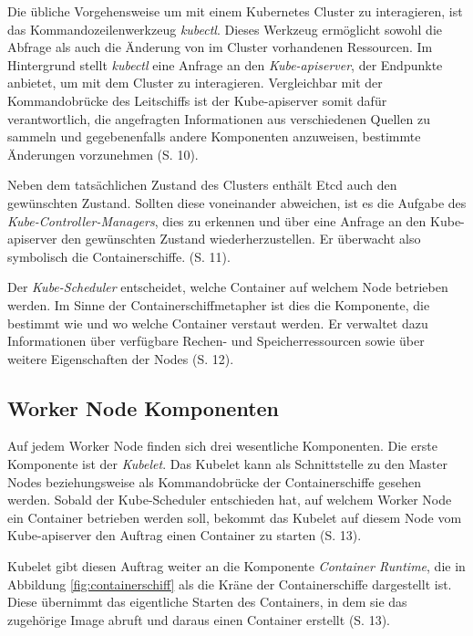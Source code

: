 \documentclass[11pt,a4paper]{article}
\begin{document}
Die übliche Vorgehensweise um mit einem Kubernetes Cluster zu interagieren, ist das Kommandozeilenwerkzeug \emph{kubectl}.
Dieses Werkzeug ermöglicht sowohl die Abfrage als auch die Änderung von im Cluster vorhandenen Ressourcen.
Im Hintergrund stellt \emph{kubectl} eine Anfrage an den \emph{Kube-apiserver}, der Endpunkte anbietet,
um mit dem Cluster zu interagieren. Vergleichbar mit der Kommandobrücke des Leitschiffs ist der Kube-apiserver
somit dafür verantwortlich, die angefragten Informationen
aus verschiedenen Quellen zu sammeln und gegebenenfalls andere Komponenten anzuweisen, bestimmte Änderungen vorzunehmen \cite{Schmeling_Dargatz_2022} (S. 10).

Neben dem tatsächlichen Zustand des Clusters enthält Etcd auch den gewünschten Zustand.
Sollten diese voneinander abweichen, ist es die Aufgabe des \emph{Kube-Controller-Managers},
dies zu erkennen und über eine Anfrage an den Kube-apiserver den gewünschten Zustand wiederherzustellen.
Er überwacht also symbolisch die Containerschiffe. \cite{Schmeling_Dargatz_2022} (S. 11).

Der \emph{Kube-Scheduler} entscheidet, welche Container auf welchem Node betrieben werden.
Im Sinne der Containerschiffmetapher ist dies die Komponente, die bestimmt
wie und wo welche Container verstaut werden.
Er verwaltet dazu Informationen über verfügbare Rechen- und Speicherressourcen sowie über weitere Eigenschaften
der Nodes \cite{Schmeling_Dargatz_2022} (S. 12).

\subsection{Worker Node Komponenten}
\label{sec:WorkerNodeKomponenten}
Auf jedem Worker Node finden sich drei wesentliche Komponenten.
Die erste Komponente ist der \emph{Kubelet}. Das Kubelet kann als Schnittstelle
zu den Master Nodes beziehungsweise als Kommandobrücke der Containerschiffe gesehen werden.
Sobald der Kube-Scheduler entschieden hat, auf welchem
Worker Node ein Container betrieben werden soll, bekommt das Kubelet auf diesem Node
vom Kube-apiserver den Auftrag einen Container zu starten \cite{Schmeling_Dargatz_2022} (S. 13).

Kubelet gibt diesen Auftrag weiter an die Komponente \emph{Container Runtime}, die
in Abbildung \ref{fig:containerschiff} als die Kräne der Containerschiffe dargestellt ist.
Diese übernimmt das eigentliche Starten des Containers, in dem sie das zugehörige Image
abruft und daraus einen Container erstellt \cite{Schmeling_Dargatz_2022} (S. 13).
\end{document}
